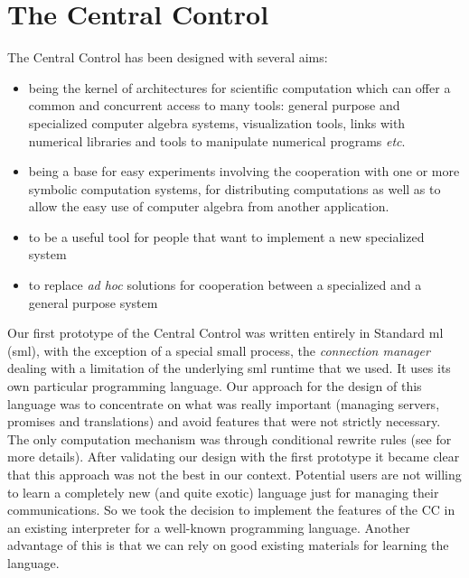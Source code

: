 \documentclass {article}
\begin{document}
\section{ The Central Control }


The Central Control has been designed with several aims:
\begin{itemize} 
\item being the kernel of architectures for scientific computation which
can offer a common and concurrent access to many tools:
general purpose and specialized computer algebra
systems, visualization tools, links with numerical libraries and tools to
manipulate numerical programs {\sl etc}.
\item being a base for easy experiments involving the cooperation with one
or more symbolic computation systems, for distributing computations as well
as to allow the easy use of computer algebra from another application.
\item to be a useful tool for people that want to implement a new specialized
system 
\item to replace {\sl ad hoc} solutions for cooperation between a specialized
and a general purpose system
\end{itemize} 

Our first prototype of the Central Control was written entirely in Standard 
{\sc ml} ({\sc sml}), with the exception of a special small process, the {\sl
connection manager} dealing with a limitation of the underlying {\sc sml}
runtime that we used.  
It uses its own particular programming language. Our
approach for the design of this language was to concentrate on what was
really important (managing servers, promises and translations) and avoid
features that were not strictly necessary. The only computation mechanism was
through conditional rewrite rules (see  \cite{kn:CC94} for more details). 
After validating our design with the first prototype it became clear that this
approach was not the best in our context. Potential users are not willing
to learn a completely new (and quite exotic) language just for managing their
communications. So we took the decision to implement the features of the CC
in an existing interpreter for a well-known programming language.
Another advantage of this is that we can rely on good existing materials for
learning the language.
\end{document}

